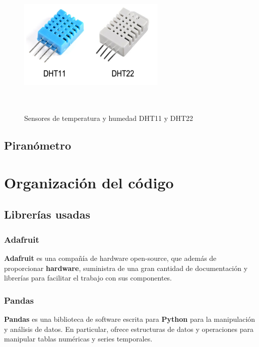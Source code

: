  \begin{figure}[htb]
	
	\begin{center}
		\includegraphics[width=7cm,height=7cm]{figures/sensorTemperaturaHumedad.png}
		\caption{Sensores de temperatura y humedad DHT11 y DHT22}
	\end{center}
	
	\label{sensor}
\end{figure} 

\subsection*{Piranómetro}

\section{Organización del código}
\label{makereference4.3} 
	\subsection{Librerías usadas}
		\subsubsection{Adafruit}
		\textbf{Adafruit} es una compañía de hardware open-source, que además de proporcionar \textbf{hardware}, suministra de una gran cantidad de documentación y librerías para facilitar el trabajo con sus componentes.
		
		\subsubsection{Pandas}
		\textbf{Pandas} es una biblioteca de software escrita para \textbf{Python} para la manipulación y análisis de datos. En particular, ofrece estructuras de datos y operaciones para manipular tablas numéricas y series temporales.
		
